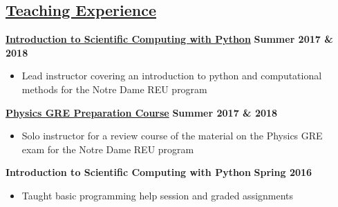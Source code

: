\documentclass[margin]{res}
\begin{document}
\begin{resume}
\section{\href{https://www3.nd.edu/~brose3/\#classes}{Teaching Experience}}\label{teaching}
\textbf{\href{https://www3.nd.edu/~brose3/2017reu-cmp}{Introduction to Scientific Computing with Python}} \hfill{} \textbf{Summer 2017 \& 2018}
\begin{itemize}\itemsep -2pt
    \item[] Lead instructor covering an introduction to python and computational \\methods for the Notre Dame REU program
    \end{itemize} \vspace{-12pt}
\textbf{\href{https://www3.nd.edu/~brose3/2017reu-gre}{Physics GRE Preparation Course}} \hfill{} \textbf{Summer 2017 \& 2018}
\begin{itemize}\itemsep -2pt
    \item[] Solo instructor for a review course of the material on the Physics GRE \\exam for the Notre Dame REU program
    \end{itemize} \vspace{-12pt}
\textbf{Introduction to Scientific Computing with Python} \hfill{} \textbf{Spring 2016}
    \begin{itemize}\itemsep -2pt
    \item[] Taught basic programming help session and graded assignments
    \end{itemize} \vspace{-12pt}

\end{resume}
\end{document}
